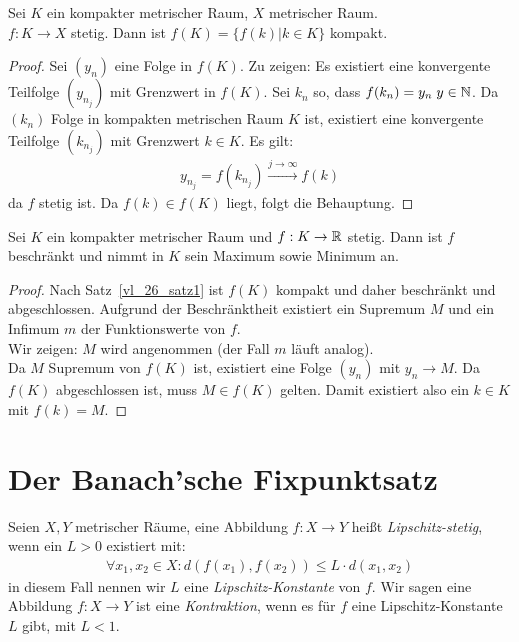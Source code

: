 \begin{Satz}\label{vl_26_satz1}%
	Sei $K$ ein kompakter metrischer Raum, $X$ metrischer Raum. \\
	$f: K \rightarrow X$ 
	stetig. Dann ist $f(K) = \{f(k)\vert k \in K\}$ kompakt.
\end{Satz}

\begin{proof}
	Sei $(y_n)$ eine Folge in $f(K)$. Zu zeigen: Es existiert eine konvergente 
	Teilfolge $(y_{n_j})$ mit Grenzwert in $f(K)$. Sei $k_n$ so, dass $f(k_n) 
	= y_n \; y \in \mathbb{N}$. Da $(k_n)$ Folge in kompakten metrischen Raum $K$ ist, 
	existiert eine konvergente Teilfolge $(k_{n_j})$ mit Grenzwert $k \in K$. Es 
	gilt: 
	\begin{align*}
		y_{n_j} = f(k_{n_j}) \xrightarrow{j \rightarrow \infty} f(k)
	\end{align*}
	da $f$ stetig ist. Da $f(k) \in f(K)$ liegt, folgt die Behauptung.
\end{proof}

\begin{Korollar}%
	Sei $K$ ein kompakter metrischer Raum und $f: K \rightarrow \mathbb{R}$ stetig. 
	Dann ist $f$ beschränkt und nimmt in $K$ sein Maximum sowie Minimum an.
\end{Korollar}

\begin{proof}
	Nach Satz~\ref{vl_26_satz1} ist $f(K)$ kompakt und daher beschränkt und 
	abgeschlossen. Aufgrund der Beschränktheit existiert ein Supremum $M$ und 
	ein Infimum $m$ der Funktionswerte von $f$. \\
	Wir zeigen: $M$ wird angenommen (der Fall $m$ läuft analog).\\
	Da $M$ Supremum von $f(K)$ ist, existiert eine Folge $(y_n)$ mit 
	$y_n \rightarrow M$. Da $f(K)$ abgeschlossen ist, muss $M \in f(K)$ gelten. 
	Damit existiert also ein $k \in K$ mit $f(k) = M$. 
\end{proof}

\cleardoublepage
\section{Der Banach'sche Fixpunktsatz}

\begin{Definition}%
	Seien $X,Y$ metrischer Räume, eine Abbildung $f: X \rightarrow Y$ heißt 
	\emph{Lipschitz-stetig}, wenn ein $L > 0$ existiert mit:
	\begin{align*}
		\forall x_1, x_2 \in X: d(f(x_1),f(x_2)) \leq L \cdot d(x_1,x_2)
	\end{align*}
	in diesem Fall nennen wir $L$ eine \emph{Lipschitz-Konstante} von $f$.
	Wir sagen eine Abbildung $f: X \rightarrow Y$ ist eine \emph{Kontraktion}, 
	wenn es für $f$ eine Lipschitz-Konstante $L$ gibt, mit $L < 1$.
\end{Definition}

